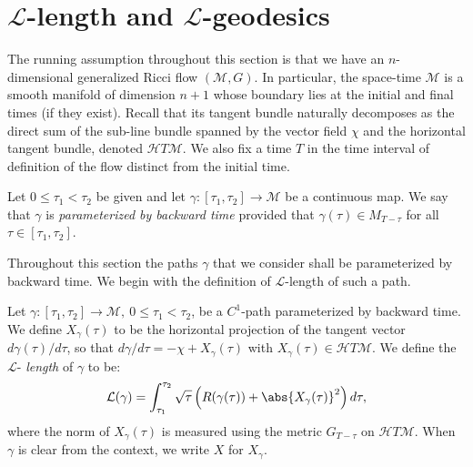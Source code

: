\section{${\mathcal L}$-length and ${\mathcal L}$-geodesics}

The running assumption throughout this section is that we have an
$n$-dimensional generalized Ricci flow $({\mathcal M},G)$. In
particular, the space-time ${\mathcal M}$ is a smooth manifold of
dimension $n+1$ whose boundary lies at the initial and final times
(if they exist). Recall that its tangent bundle naturally decomposes
as the direct sum of the sub-line bundle spanned by the vector field
$\chi$ and the horizontal tangent bundle, denoted ${\mathcal
HT}{\mathcal M}$. We also fix a time $T$ in the time interval of
definition of the flow distinct from the initial time.


\begin{definition}\label{def:parameterized-by-backward-time}
Let $0\le \tau_1<\tau_2$ be given and let $\gamma\colon
[\tau_1,\tau_2]\to {\mathcal M}$ be a continuous map. We say that
$\gamma$ is {\em parameterized by backward time} provided that $\gamma(\tau)\in M_{T-\tau}$ for all
$\tau\in [\tau_1,\tau_2]$.
\end{definition}


Throughout this section the paths $\gamma$ that we consider shall be
parameterized by backward time. We begin with the definition of
${\mathcal L}$-length of such a path.

\begin{definition}\label{def:l-length}
\label{Llength}
Let  $\gamma\colon [\tau_{1},\tau_{2}]\rightarrow {\mathcal M},\ 0
\le \tau_{1} < \tau_{2}$, be a  $C^{1}$-path parameterized by
backward time. We define $X_\gamma(\tau)$ to be the horizontal
projection of the tangent vector $d\gamma(\tau)/d\tau$, so that
$d\gamma/d\tau=-\chi+X_\gamma(\tau)$ with $X_\gamma(\tau)\in
{\mathcal HT}{\mathcal M}$. We define the $\mathcal{L}$-{\em
length} of $\gamma$ to be:
$$\mathcal{L}(\gamma) = \int_{\tau_{1}}^{\tau_{2}}
\sqrt{\tau}\left(R(\gamma(\tau)) +
\abs{X_\gamma(\tau)}^{2}\right)d\tau,$$
where the norm of $X_\gamma(\tau)$ is measured using the metric
$G_{T-\tau}$ on ${\mathcal HT}{\mathcal M}$. When $\gamma$ is clear
from the context, we write $X$ for $X_\gamma$.
\end{definition}



